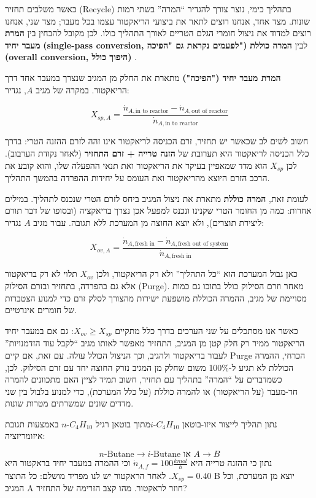 \documentclass[
  hebrew,
  letterpaper,
  DIV=11,
  numbers=noendperiod]{scrreprt}
\begin{document}
כאשר משלבים תחזיר (Recycle) בתהליך כימי, נוצר צורך להגדיר ``המרה'' בשתי
רמות שונות. מצד אחד, אנחנו רוצים לתאר את ביצועי הריאקטור עצמו בכל מעבר;
מצד שני, אנחנו רוצים למדוד את ניצול חומרי הגלם הטריים לאורך התהליך כולו.
לכן מקובל להבחין בין \textbf{המרת מעבר יחיד} \textbf{(single-pass
conversion, לפעמים נקראת גם "הפיכה")} לבין \textbf{המרה כוללת (overall
conversion, היפוך כולל)} .

\textbf{המרת מעבר יחיד ("הפיכה")} מתארת את החלק מן המגיב שנצרך במעבר אחד
דרך הריאקטור. במקרה של מגיב \(A\), נגדיר:

\[X_{sp,A} = \frac{{\dot{n}}_{A,\text{in to reactor}} - {\dot{n}}_{A,\text{out of reactor}}}{{\dot{n}}_{A,\text{in to reactor}}}\]

חשוב לשים לב שכאשר יש תחזיר, זרם הכניסה לריאקטור אינו זהה לזרם ההזנה
הטרי: בדרך כלל הכניסה לריאקטור היא תערובת של \textbf{הזנה טרייה + זרם
התחזיר} (לאחר נקודת הערבוב). לכן \(X_{sp}\) הוא מדד שמאפיין בעיקר את
הריאקטור ואת תנאי ההפעלה שלו, והוא קובע את הרכב הזרם היוצא מהריאקטור ואת
העומס על יחידות ההפרדה בהמשך התהליך.

לעומת זאת, \textbf{המרה כוללת} מתארת את ניצול המגיב ביחס לזרם הטרי שנכנס
לתהליך. במילים אחרות: כמה מן החומר הטרי שקנינו ונכנס למפעל אכן נצרך
בריאקציה (ובסופו של דבר תורם ליצירת תוצרים), ולא יוצא החוצה מן המערכת
ללא תגובה. עבור מגיב \(A\) נגדיר:

\[X_{ov,A} = \frac{{\dot{n}}_{A,\text{fresh in}} - {\dot{n}}_{A,\text{fresh out of system}}}{{\dot{n}}_{A,\text{fresh in}}}\]

כאן גבול המערכת הוא ``כל התהליך'' ולא רק הריאקטור, ולכן \(X_{ov}\) תלוי
לא רק בריאקטור אלא גם בהפרדה, בתחזיר ובזרם הסילוק (Purge). מאחר וזרם
הסילוק כולל בתוכו גם כמות מסויימת של מגיב, ההמרה הכוללת מושפעת ישירות
מהצורך לסלק זרם כדי למנוע הצטברות של חומרים אינרטיים.

כאשר אנו מסתכלים על שני הערכים בדרך כלל מתקיים \(X_{ov} \geq X_{sp}\):
גם אם במעבר יחיד הריאקטור ממיר רק חלק קטן מן המגיב, התחזיר מאפשר לאותו
מגיב ``לקבל עוד הזדמנויות'' לעבור בריאקטור ולהגיב, וכך הניצול הכולל
עולה. עם זאת, אם קיים Purge הכרחי, ההמרה הכוללת לא תגיע ל-100\% משום
שחלק מן המגיב נזרק החוצה יחד עם זרם הסילוק. לכן, כשמדברים על ``המרה''
בתהליך עם תחזיר, חשוב תמיד לציין האם מתכוונים להמרה חד-מעבר (על
הריאקטור) או להמרה כוללת (על כלל המערכת), כדי למנוע בלבול בין שני מדדים
שונים שמשרתים מטרות שונות.

נתון תהליך לייצור איזו-בוטאן \(i\text{-}C_{4}H_{10}\)מתוך בוטאן רגיל
\(n\text{-}C_{4}H_{10}\) באמצעות תגובת איזומריזציה:

\[n\text{-Butane} \rightarrow i\text{-Butane או }A \rightarrow B\] נתון
כי ההזנה טרייה היא \({\dot{n}}_{A,f} = 100\frac{kmol}{h}\) וכי ההמרה
במעבר יחיד בראקטור היא \(X_{sp} = 0.40\). לאחר הראקטור יש לנו מפריד
מושלם: כל התוצר B יוצא מן המערכת, וכל המגיב A חוזר לראקטור. מהו קצב
הזרימה של התחזיר?
\end{document}
